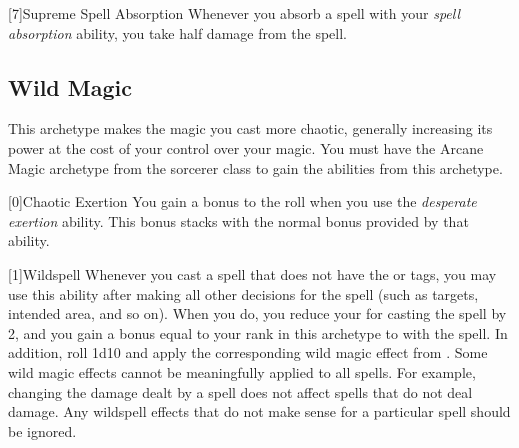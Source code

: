         [7]{Supreme Spell Absorption} Whenever you absorb a spell with your \textit{spell absorption} ability, you take half damage from the spell.

    \newpage
    \subsection{Wild Magic}
        This archetype makes the magic you cast more chaotic, generally increasing its power at the cost of your control over your magic.
        You must have the Arcane Magic archetype from the sorcerer class to gain the abilities from this archetype.

        [0]{Chaotic Exertion} You gain a  bonus to the roll when you use the \textit{desperate exertion} ability.
        This bonus stacks with the normal  bonus provided by that ability.

        [1]{Wildspell} Whenever you cast a spell that does not have the  or  tags, you may use this ability after making all other decisions for the spell (such as targets, intended area, and so on).
        When you do, you reduce your  for casting the spell by 2, and you gain a bonus equal to your rank in this archetype to  with the spell.
        In addition, roll 1d10 and apply the corresponding wild magic effect from .
        Some wild magic effects cannot be meaningfully applied to all spells.
        For example, changing the damage dealt by a spell does not affect spells that do not deal damage.
        Any wildspell effects that do not make sense for a particular spell should be ignored.

